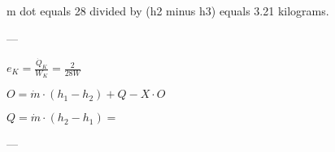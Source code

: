 m dot equals 28 divided by (h2 minus h3) equals 3.21 kilograms.  

---

\( e_K = \frac{\dot{Q}_K}{W_K} = \frac{2}{28W} \)

\( O = \dot{m} \cdot (h_1 - h_2) + Q - X \cdot O \)

\( Q = \dot{m} \cdot (h_2 - h_1) = \)

---